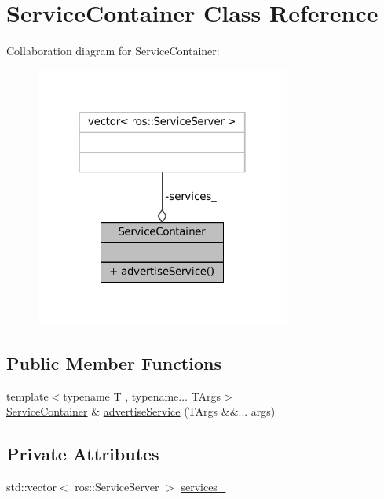 \hypertarget{classServiceContainer}{}\section{Service\+Container Class Reference}
\label{classServiceContainer}


Collaboration diagram for Service\+Container\+:
\nopagebreak
\begin{figure}[H]
\begin{center}
\leavevmode
\includegraphics[width=238pt]{classServiceContainer__coll__graph}
\end{center}
\end{figure}
\subsection*{Public Member Functions}
\begin{DoxyCompactItemize}
\item 
{\footnotesize template$<$typename T , typename... T\+Args$>$ }\\\hyperlink{classServiceContainer}{Service\+Container} \& \hyperlink{classServiceContainer_a46e347a74b89b0001362544711b18862}{advertise\+Service} (T\+Args \&\&... args)
\end{DoxyCompactItemize}
\subsection*{Private Attributes}
\begin{DoxyCompactItemize}
\item 
std\+::vector$<$ ros\+::\+Service\+Server $>$ \hyperlink{classServiceContainer_a0c4a14a2e00d160ba242062dc7dc7caa}{services\+\_\+}
\end{DoxyCompactItemize}


